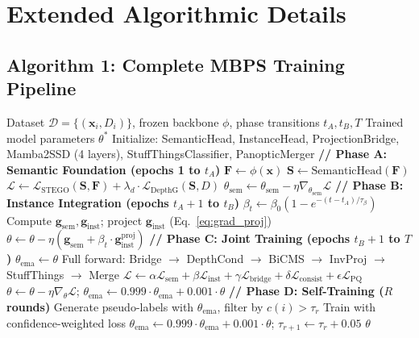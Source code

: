\documentclass{article}
\newcommand{\lsem}{\mathcal{L}_{\text{sem}}}
\newcommand{\linst}{\mathcal{L}_{\text{inst}}}
\newcommand{\lbridge}{\mathcal{L}_{\text{bridge}}}
\newcommand{\lconsist}{\mathcal{L}_{\text{consist}}}
\newcommand{\lpq}{\mathcal{L}_{\text{PQ}}}
\begin{document}
\section{Extended Algorithmic Details}
\label{sec:appendix_algorithms}

\subsection{Algorithm 1: Complete MBPS Training Pipeline}

\begin{algorithm}[H]
\caption{MBPS: Mamba-Bridge Panoptic Segmentation Training}
\label{alg:mbps_train}
\begin{algorithmic}[1]
\REQUIRE Dataset $\mathcal{D} = \{(\mathbf{x}_i, D_i)\}$, frozen backbone $\phi$, phase transitions $t_A, t_B, T$
\ENSURE Trained model parameters $\theta^*$
\STATE Initialize: SemanticHead, InstanceHead, ProjectionBridge, Mamba2SSD (4 layers), StuffThingsClassifier, PanopticMerger
\STATE \textbf{// Phase A: Semantic Foundation (epochs 1 to $t_A$)}
        \STATE $\mathbf{F} \leftarrow \phi(\mathbf{x})$ 
        \STATE $\mathbf{S} \leftarrow \text{SemanticHead}(\mathbf{F})$ 
        \STATE $\mathcal{L} \leftarrow \mathcal{L}_{\text{STEGO}}(\mathbf{S}, \mathbf{F}) + \lambda_d \cdot \mathcal{L}_{\text{DepthG}}(\mathbf{S}, D)$
        \STATE $\theta_{\text{sem}} \leftarrow \theta_{\text{sem}} - \eta \nabla_{\theta_{\text{sem}}} \mathcal{L}$
    \ENDFOR
\ENDFOR
\STATE \textbf{// Phase B: Instance Integration (epochs $t_A+1$ to $t_B$)}
    \STATE $\beta_t \leftarrow \beta_0 (1 - e^{-(t-t_A)/\tau_\beta})$
        \STATE Compute $\mathbf{g}_{\text{sem}}, \mathbf{g}_{\text{inst}}$; project $\mathbf{g}_{\text{inst}}$ (Eq.~\ref{eq:grad_proj})
        \STATE $\theta \leftarrow \theta - \eta(\mathbf{g}_{\text{sem}} + \beta_t \cdot \mathbf{g}_{\text{inst}}^{\text{proj}})$
    \ENDFOR
\ENDFOR
\STATE \textbf{// Phase C: Joint Training (epochs $t_B+1$ to $T$)}
\STATE $\theta_{\text{ema}} \leftarrow \theta$
        \STATE Full forward: Bridge $\rightarrow$ DepthCond $\rightarrow$ BiCMS $\rightarrow$ InvProj $\rightarrow$ StuffThings $\rightarrow$ Merge
        \STATE $\mathcal{L} \leftarrow \alpha \lsem + \beta \linst + \gamma \lbridge + \delta \lconsist + \epsilon \lpq$
        \STATE $\theta \leftarrow \theta - \eta \nabla_\theta \mathcal{L}$; \quad $\theta_{\text{ema}} \leftarrow 0.999 \cdot \theta_{\text{ema}} + 0.001 \cdot \theta$
    \ENDFOR
\ENDFOR
\STATE \textbf{// Phase D: Self-Training ($R$ rounds)}
    \STATE Generate pseudo-labels with $\theta_{\text{ema}}$, filter by $c(i) > \tau_r$
     Train with confidence-weighted loss \ENDFOR
    \STATE $\theta_{\text{ema}} \leftarrow 0.999 \cdot \theta_{\text{ema}} + 0.001 \cdot \theta$; \quad $\tau_{r+1} \leftarrow \tau_r + 0.05$
\ENDFOR
\RETURN $\theta$
\end{algorithmic}
\end{algorithm}
\end{document}
